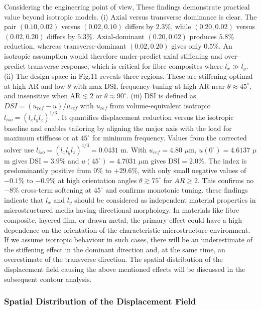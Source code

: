 \documentclass[final,3p,times,fleqn]{elsarticle}
\begin{document}
Considering the engineering point of view,
These findings demonstrate practical value beyond isotropic models. (i) Axial versus transverse dominance is clear. The pair $(0.10,0.02)$ versus $(0.02,0.10)$ differs by $2.3\%$, while $(0.20,0.02)$ versus $(0.02,0.20)$ differs by $5.3\%$. Axial-dominant $(0.20,0.02)$ produces $5.8\%$ reduction, whereas transverse-dominant $(0.02,0.20)$ gives only $0.5\%$. An isotropic assumption would therefore under-predict axial stiffening and over-predict transverse response, which is critical for fibre composites where $l_x\gg l_y$. (ii) The design space in Fig.11 reveals three regions. These are stiffening-optimal at high AR and low $\theta$ with max DSI, frequency-tuning at high AR near $\theta\approx45^\circ$, and insensitive when AR$\lesssim2$ or $\theta\approx90^\circ$. (iii) DSI is defined as $DSI=(u_{ref}-u)/u_{ref}$ with $u_{ref}$ from volume-equivalent isotropic $l_{iso}=(l_xl_yl_z)^{1/3}$. It quantifies displacement reduction versus the isotropic baseline and enables tailoring by aligning the major axis with the load for maximum stiffness or at $45^\circ$ for minimum frequency. Values from the corrected solver use $l_{iso}=(l_xl_yl_z)^{1/3}=0.0431$ m. With $u_{ref}=4.80$ $\mu$m, $u(0^\circ)=4.6137$ $\mu$m gives DSI$=3.9\%$ and $u(45^\circ)=4.7031$ $\mu$m gives DSI$=2.0\%$. The index is predominantly positive from $0\%$ to $+29.6\%$, with only small negative values of $-0.1\%$ to $-0.9\%$ at high orientation angles $\theta\gtrsim75^\circ$ for $AR\ge2$. This confirms no $-8\%$ cross-term softening at $45^\circ$ and confirms monotonic tuning.
these findings indicate that $l_{x}$ and $l_{y}$ should be considered
as independent material properties in microstructured media having
directional morphology.
In materials like fibre composite, layered film, or drawn metal,
the primary effect could have a high dependence on the orientation
of the characteristic microstructure environment.
If we assume isotropic behaviour in such cases, there will be an
underestimate of the stiffening effect in the dominant direction and,
at the same time, an overestimate of the transverse direction.
The spatial distribution of the displacement field causing the above
mentioned effects will be discussed in the subsequent contour analysis.

\subsubsection{Spatial Distribution of the Displacement Field}
\label{sec:2D_displacement_contours}
\end{document}
